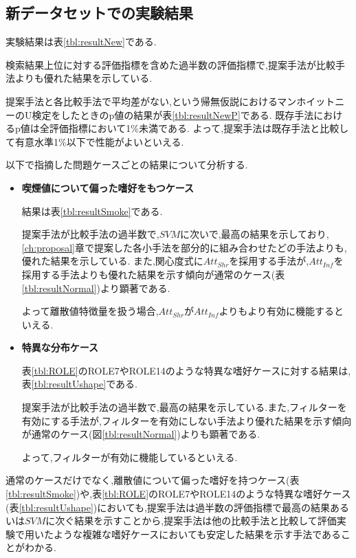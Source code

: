 \subsection{新データセットでの実験結果}
実験結果は表\ref{tbl:resultNew}である.\par
検索結果上位に対する評価指標を含めた過半数の評価指標で,提案手法が比較手法よりも優れた結果を示している.\par
提案手法と各比較手法で平均差がない,という帰無仮説におけるマンホイットニーのU検定をしたときのp値の結果が表\ref{tbl:resultNewP}である.
既存手法におけるp値は全評価指標において1\%未満である.
よって,提案手法は既存手法と比較して有意水準1\%以下で性能がよいといえる.\par
以下で指摘した問題ケースごとの結果について分析する.
\begin{itemize}
  \item {\bf 喫煙値について偏った嗜好をもつケース}\par
    結果は表\ref{tbl:resultSmoke}である.\par
提案手法が比較手法の過半数で,$SVM$に次いで,最高の結果を示しており,\ref{ch:proposal}章で提案した各小手法を部分的に組み合わせたどの手法よりも,優れた結果を示している.
    また,関心度式に$Att_{Shr}$を採用する手法が,$Att_{Inf}$を採用する手法よりも優れた結果を示す傾向が通常のケース(表\ref{tbl:resultNormal})より顕著である.\par
  よって離散値特徴量を扱う場合,$Att_{Shr}$が$Att_{Inf}$よりもより有効に機能するといえる.
  \item {\bf 特異な分布ケース}\par
    表\ref{tbl:ROLE}のROLE7やROLE14のような特異な嗜好ケースに対する結果は,表\ref{tbl:resultUshape}である.\par
    提案手法が比較手法の過半数で,最高の結果を示している.また,フィルターを有効にする手法が,フィルターを有効にしない手法より優れた結果を示す傾向が通常のケース(図\ref{tbl:resultNormal})よりも顕著である.\par
    よって,フィルターが有効に機能しているといえる.
\end{itemize}
\par

通常のケースだけでなく,離散値について偏った嗜好を持つケース(表\ref{tbl:resultSmoke})や,表\ref{tbl:ROLE}のROLE7やROLE14のような特異な嗜好ケース(表\ref{tbl:resultUshape})においても,提案手法は過半数の評価指標で最高の結果あるいは$SVM$に次ぐ結果を示すことから,提案手法は他の比較手法と比較して評価実験で用いたような複雑な嗜好ケースにおいても安定した結果を示す手法であることがわかる.

